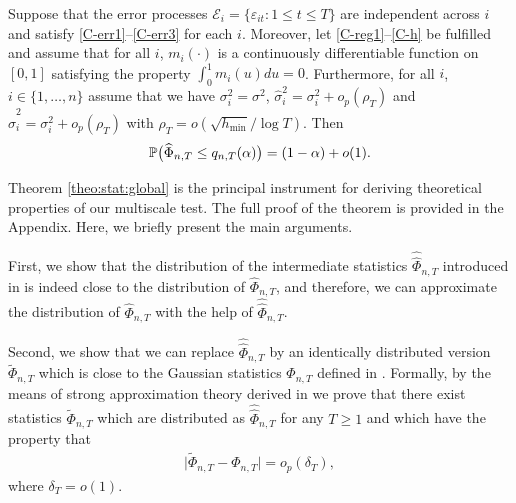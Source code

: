 \documentclass[a4paper,12pt]{article}
\makeatletter
\renewcommand{\eqref}[1]{\tagform@{\ref{#1}}}
\newcommand{\doublehattwo}[1]{\widehat{\widehat{#1}}}
\makeatother
\begin{document}
\begin{theorem}\label{theo:stat:global}
Suppose that the error processes $\mathcal{E}_i = \{ \varepsilon_{it}: 1 \le t \le T \}$ are independent across $i$ and satisfy \ref{C-err1}--\ref{C-err3} for each $i$. Moreover, let \ref{C-reg1}--\ref{C-h} be fulfilled and assume that for all $i$, $m_i(\cdot)$ is a continuously differentiable function on $[0, 1]$ satisfying the property $\int_0^1 m_i(u) du = 0$. Furthermore, for all $i$, $i \in \{1, \ldots, n\}$ assume that we have $\sigma_i^2 = \sigma^2$, $\widehat{\sigma}_i^2 = \sigma^2_i + o_p(\rho_T)$ and $\doublehattwo{\sigma}_i^2 = \sigma^2_i + o_p(\rho_T)$ with $\rho_T = o(\sqrt{h_{\min}}/\log T)$. Then 
\[ \mathbb{P} \big( \widehat{\Phi}_{n,T} \le q_{n,T}(\alpha) \big) = (1 - \alpha) + o(1). \]
\end{theorem}
Theorem \ref{theo:stat:global} is the principal instrument for deriving theoretical properties of our multiscale test. The full proof of the theorem is provided in the Appendix. Here, we briefly present the main arguments.

First, we show that the distribution of the intermediate statistics $\doublehattwo{\Phi}_{n, T}$ introduced in \eqref{eq:Phi_doublehat} is indeed close to the distribution of $\widehat{\Phi}_{n, T}$, and therefore, we can approximate the distribution of $\widehat{\Phi}_{n, T}$ with the help of $\doublehattwo{\Phi}_{n, T}$.

Second, we show that we can replace $\doublehattwo{\Phi}_{n, T}$ by an identically distributed version $\widetilde{\Phi}_{n, T}$ which is close to the Gaussian statistics $\Phi_{n, T}$ defined in \eqref{eq:Phi}. Formally, by the means of strong approximation theory derived in \cite{BerkesLiuWu2014} we prove that there exist statistics $\widetilde{\Phi}_{n, T}$ which are distributed as $\doublehattwo{\Phi}_{n, T}$ for any $T \ge 1$ and which have the property that 
\begin{align}\label{eq:proof1}
\big| \widetilde{\Phi}_{n, T} - \Phi_{n,T} \big| = o_p( \delta_T),
\end{align}
where $\delta_T = o(1)$.
\end{document}

